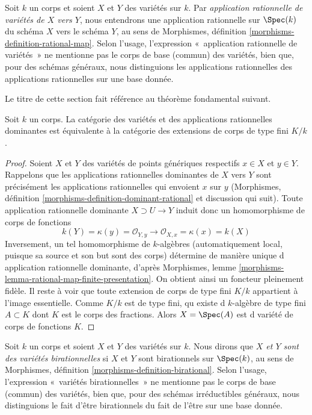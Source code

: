 \noindent
Soit $k$ un corps et soient $X$ et $Y$ des variétés sur $k$.
Par {\it application rationnelle de variétés de $X$ vers $Y$}, nous entendrons
une application rationnelle sur $\Spec(k)$ du schéma $X$ vers le schéma $Y$,
au sens de Morphismes, définition \ref{morphisms-definition-rational-map}.
Selon l'usage, l'expression «~application rationnelle de variétés~» ne
mentionne pas le corps de base (commun) des variétés, bien que, pour des
schémas généraux, nous distinguions les applications rationnelles des
applications rationnelles sur une base donnée.

\medskip\noindent
Le titre de cette section fait référence au théorème fondamental suivant.

\begin{theorem}
\label{theorem-varieties-rational-maps}
Soit $k$ un corps. La catégorie des variétés
et des applications rationnelles dominantes est équivalente
à la catégorie des extensions de corps de type fini $K/k$.
\end{theorem}

\begin{proof}
Soient $X$ et $Y$ des variétés de points génériques respectifs
$x \in X$ et $y \in Y$. Rappelons que les applications rationnelles
dominantes de $X$ vers $Y$ sont précisément les applications
rationnelles qui envoient $x$ sur $y$ (Morphismes,
définition \ref{morphisms-definition-dominant-rational} et discussion
qui suit). Toute application rationnelle dominante $X
\supset U \to Y$ induit donc un homomorphisme de corps de fonctions
$$
k(Y) = \kappa(y) = \mathcal{O}_{Y, y}
\longrightarrow
\mathcal{O}_{X, x} = \kappa(x) = k(X)
$$
Inversement, un tel homomorphisme de $k$-algèbres (automatiquement
local, puisque sa source et son but sont des corps) détermine de
manière unique d application rationnelle dominante, d'après Morphismes,
lemme \ref{morphisms-lemma-rational-map-finite-presentation}. On obtient ainsi
un foncteur pleinement fidèle. Il reste à voir que toute extension de
corps de type fini $K/k$ appartient à l'image essentielle. Comme $K/k$
est de type fini, qu existe d $k$-algèbre de type fini $A \subset K$
dont $K$ est le corps des fractions. Alors $X = \Spec(A)$ est d variété
de corps de fonctions $K$.
\end{proof}

\noindent
Soit $k$ un corps et soient $X$ et $Y$ des variétés sur $k$.
Nous dirons que {\it $X$ et $Y$ sont des variétés birationnelles}
si $X$ et $Y$ sont birationnels sur $\Spec(k)$, au sens de
Morphismes, définition \ref{morphisms-definition-birational}.
Selon l'usage, l'expression «~variétés birationnelles~» ne mentionne pas
le corps de base (commun) des variétés, bien que, pour des schémas
irréductibles généraux, nous distinguions le fait d'être birationnels
du fait de l'être sur une base donnée.

